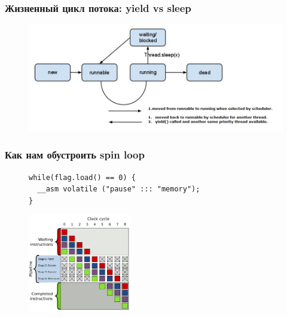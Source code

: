\documentclass[aspectratio=169, pdf, 8pt, unicode]{beamer}
\begin{document}
\begin{frame}[fragile]
\frametitle{Жизненный цикл потока: yield vs sleep}
\begin{figure}[H]
\centering
\includegraphics[width=1.0\textwidth]{fig/yield_vs_sleep.jpg}
\end{figure}
\end{frame}

\begin{frame}[fragile]
\frametitle{Как нам обустроить spin loop}
\begin{figure}[H]
\centering
\begin{minipage}{0.8\textwidth}
\begin{verbatim}
while(flag.load() == 0) {
  __asm volatile ("pause" ::: "memory");
}
\end{verbatim}
\end{minipage}
\end{figure}
\begin{figure}[H]
\centering
\includegraphics[width=0.4\textwidth]{fig/pipeline.png}
\end{figure}
\end{frame}
\end{document}
